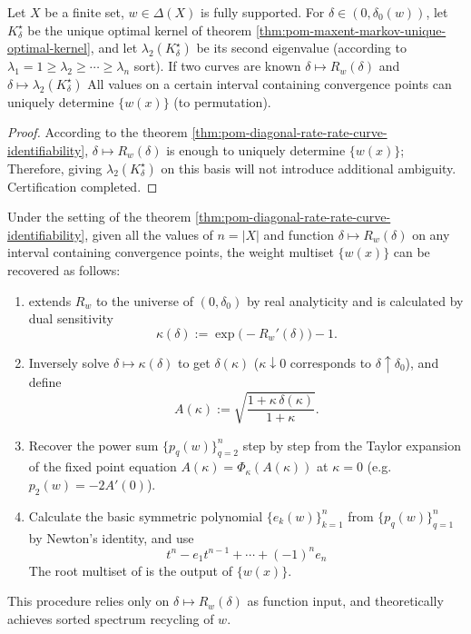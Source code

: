 \begin{corollary}\label{cor:pom-diagonal-rate-two-curve-identifiability}
Let \(X\) be a finite set, \(w\in\Delta(X)\) is fully supported.
For \(\delta\in(0,\delta_0(w))\), let \(K^\star_\delta\) be the unique optimal kernel of theorem \ref{thm:pom-maxent-markov-unique-optimal-kernel}, and let \(\lambda_2(K^\star_\delta)\) be its second eigenvalue (according to \(\lambda_1=1\ge \lambda_2\ge\cdots\ge \lambda_n\) sort).
If two curves are known
\(
\delta\mapsto R_w(\delta)
\)
and
\(
\delta\mapsto \lambda_2(K^\star_\delta)
\)
All values ​​on a certain interval containing convergence points can uniquely determine \(\{w(x)\}\) (to permutation).
\end{corollary}
\begin{proof}
According to the theorem \ref{thm:pom-diagonal-rate-rate-curve-identifiability}, \(\delta\mapsto R_w(\delta)\) is enough to uniquely determine \(\{w(x)\}\);
Therefore, giving \(\lambda_2(K^\star_\delta)\) on this basis will not introduce additional ambiguity. Certification completed.
\end{proof}

\begin{proposition}\label{prop:pom-diagonal-rate-reconstruct-w-from-rate-curve}
Under the setting of the theorem \ref{thm:pom-diagonal-rate-rate-curve-identifiability}, given all the values ​​of \(n=|X|\) and function \(\delta\mapsto R_w(\delta)\) on any interval containing convergence points, the weight multiset \(\{w(x)\}\) can be recovered as follows:
\begin{enumerate}
\item extends \(R_w\) to the universe of \((0,\delta_0)\) by real analyticity and is calculated by dual sensitivity
  \[
  \kappa(\delta):=\exp\bigl(-R_w'(\delta)\bigr)-1.
  \]
\item Inversely solve \(\delta\mapsto\kappa(\delta)\) to get \(\delta(\kappa)\) (\(\kappa\downarrow 0\) corresponds to \(\delta\uparrow\delta_0\)), and define
  \[
  A(\kappa):=\sqrt{\frac{1+\kappa\,\delta(\kappa)}{1+\kappa}}.
  \]
\item Recover the power sum \(\{p_q(w)\}_{q=2}^{n}\) step by step from the Taylor expansion of the fixed point equation \(A(\kappa)=\Phi_\kappa(A(\kappa))\) at \(\kappa=0\) (e.g. \(p_2(w)=-2A'(0)\)).
\item Calculate the basic symmetric polynomial \(\{e_k(w)\}_{k=1}^{n}\) from \(\{p_q(w)\}_{q=1}^{n}\) by Newton's identity, and use
  \[
  t^n-e_1 t^{n-1}+\cdots+(-1)^n e_n
  \]
The root multiset of is the output of \(\{w(x)\}\).
\end{enumerate}
This procedure relies only on \(\delta\mapsto R_w(\delta)\) as function input, and theoretically achieves sorted spectrum recycling of \(w\).
\end{proposition}
